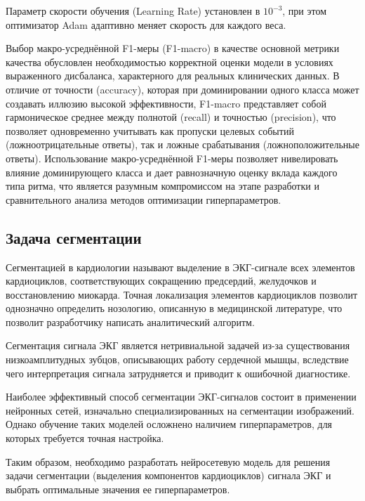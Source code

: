 \documentclass[10pt,a4paper]{book}
\begin{document}
Параметр скорости обучения (Learning Rate) установлен в $10^{-3}$, при этом оптимизатор Adam адаптивно меняет скорость для каждого веса.

Выбор макро-усреднённой F1-меры (F1-macro) в качестве основной метрики качества обусловлен необходимостью корректной оценки модели в условиях выраженного дисбаланса, характерного для реальных клинических данных. В отличие от точности (accuracy), которая при доминировании одного класса может создавать иллюзию высокой эффективности, F1-macro представляет собой гармоническое среднее между полнотой (recall) и точностью (precision), что позволяет одновременно учитывать как пропуски целевых событий (ложноотрицательные ответы), так и ложные срабатывания (ложноположительные ответы). Использование макро-усреднённой F1-меры позволяет нивелировать влияние доминирующего класса и дает равнозначную оценку вклада каждого типа ритма, что является разумным компромиссом на этапе разработки и сравнительного анализа методов оптимизации гиперпараметров.

\subsection{Задача сегментации}

Сегментацией в кардиологии называют выделение в ЭКГ-сигнале всех элементов кардиоциклов, соответствующих сокращению предсердий, желудочков и восстановлению миокарда. Точная локализация элементов кардиоциклов позволит однозначно определить нозологию, описанную в медицинской литературе, что позволит разработчику написать аналитический алгоритм.

Сегментация сигнала ЭКГ является нетривиальной задачей из-за существования низкоамплитудных зубцов, описывающих работу сердечной мышцы, вследствие чего интерпретация сигнала затрудняется и приводит к ошибочной диагностике.

Наиболее эффективный способ сегментации ЭКГ-сигналов состоит в применении нейронных сетей, изначально специализированных на сегментации изображений. Однако обучение таких моделей осложнено наличием гиперпараметров, для которых требуется точная настройка.

Таким образом, необходимо разработать нейросетевую модель для решения задачи сегментации (выделения компонентов кардиоциклов) сигнала ЭКГ и выбрать оптимальные значения ее гиперпараметров.
\end{document}
